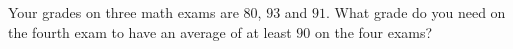 Your grades on three math exams are $80$, $93$ and $91$. What grade do you need on the fourth exam to have an average of at least $90$ on the four exams?
